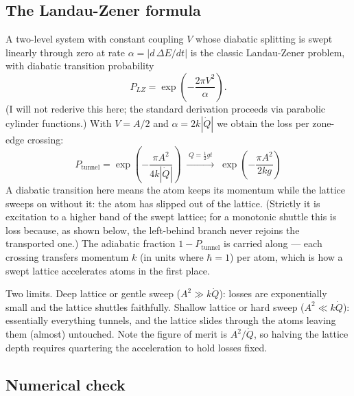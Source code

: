 \subsection{The Landau-Zener formula}

A two-level system with constant coupling $V$ whose diabatic splitting is swept
linearly through zero at rate $\alpha = |d\,\Delta E/dt|$ is the classic
Landau-Zener problem, with diabatic transition probability
$$P_{LZ} = \exp\left(-\frac{2\pi V^2}{\alpha}\right).$$
(I will not rederive this here; the standard derivation proceeds via
parabolic cylinder functions.)  With $V = A/2$ and $\alpha = 2k|\dot Q|$ we
obtain the loss per zone-edge crossing:
\begin{equation}
P_{\text{tunnel}} = \exp\left(-\frac{\pi A^2}{4 k |\dot Q|}\right)
\;\xrightarrow{\;Q = \frac{1}{2}gt\;}\;
\exp\left(-\frac{\pi A^2}{2 k g}\right)
\label{LZloss}
\end{equation}
A diabatic transition here means the atom keeps its momentum while the lattice
sweeps on without it: the atom has slipped out of the lattice.  (Strictly it
is excitation to a higher band of the swept lattice; for a monotonic shuttle
this is loss because, as shown below, the left-behind branch never rejoins
the transported one.)  The
adiabatic fraction $1 - P_{\text{tunnel}}$ is carried along --- each crossing
transfers momentum $k$ (in units where $\hbar=1$) per atom, which is how a swept lattice
accelerates atoms in the first place.

Two limits.  Deep lattice or gentle sweep
($A^2 \gg k\dot Q$): losses are exponentially small and the lattice shuttles
faithfully.  Shallow lattice or hard sweep ($A^2 \ll k\dot Q$): essentially
everything tunnels, and the lattice slides through the atoms leaving them
(almost) untouched.  Note the figure of merit is $A^2/\dot Q$, so halving the
lattice depth requires quartering the acceleration to hold losses fixed.

\subsection{Numerical check}

